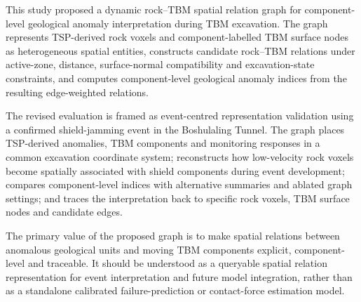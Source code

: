 This study proposed a dynamic rock--TBM spatial relation graph for component-level geological anomaly interpretation during TBM excavation. The graph represents TSP-derived rock voxels and component-labelled TBM surface nodes as heterogeneous spatial entities, constructs candidate rock--TBM relations under active-zone, distance, surface-normal compatibility and excavation-state constraints, and computes component-level geological anomaly indices from the resulting edge-weighted relations.

The revised evaluation is framed as event-centred representation validation using a confirmed shield-jamming event in the Boshulaling Tunnel. The graph places TSP-derived anomalies, TBM components and monitoring responses in a common excavation coordinate system; reconstructs how low-velocity rock voxels become spatially associated with shield components during event development; compares component-level indices with alternative summaries and ablated graph settings; and traces the interpretation back to specific rock voxels, TBM surface nodes and candidate edges.

The primary value of the proposed graph is to make spatial relations between anomalous geological units and moving TBM components explicit, component-level and traceable. It should be understood as a queryable spatial relation representation for event interpretation and future model integration, rather than as a standalone calibrated failure-prediction or contact-force estimation model.
